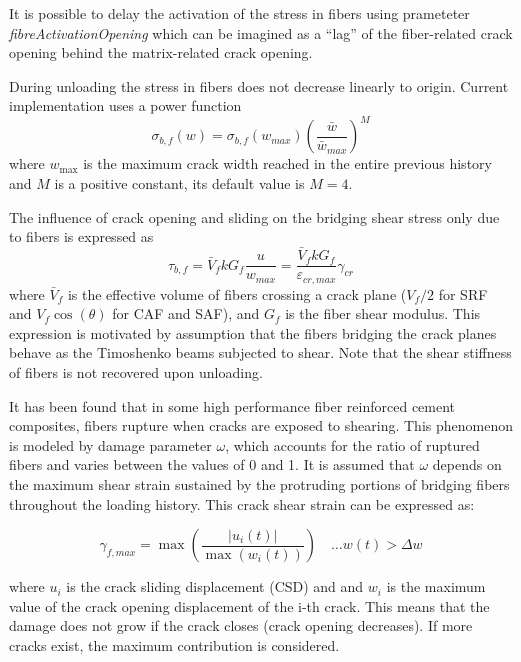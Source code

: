 \documentclass[a4paper]{article}
\newcommand{\param}[1]{{\it #1}}
\begin{document}
It is possible to delay the activation of the stress in fibers using prameteter \param{fibreActivationOpening} which can be imagined as a ``lag'' of the fiber-related crack opening behind the matrix-related crack opening.
 

During unloading the stress in fibers does not decrease linearly to origin. Current implementation uses a power function
%
\begin{equation}
  \sigma_{b,f}(w) = \sigma_{b,f}(w_{max}) \left(\frac{\bar{w}}{\bar{w}_{max}}\right)^M
\end{equation}
%
where $w_{\mathrm{max}}$ is the maximum crack width reached in the entire previous history and $M$ is a positive constant, its default value is $M = 4$.

The influence of crack opening and sliding on the bridging shear stress only due to fibers is expressed as 
\begin{equation}
\tau_{b,f} = \bar{V}_f k G_{f} \frac{u}{w_{max}} = \frac{\bar{V}_f k G_{f}}{\varepsilon_{cr,max}} \gamma_{cr} 
\end{equation}
%
where $\bar{V}_f$ is the effective volume of fibers crossing a crack plane ($V_f/2$ for SRF and $V_f \cos (\theta)$ for CAF and SAF), and $G_{f}$ is the fiber shear modulus. This expression is motivated by assumption that the fibers bridging the crack planes behave as the Timoshenko beams subjected to shear. Note that the shear stiffness of fibers is not recovered upon unloading.

It has been found that in some high performance fiber reinforced cement composites, fibers rupture when cracks are exposed to shearing. This phenomenon is modeled by damage parameter $\omega$, which accounts for the ratio of ruptured fibers and varies between the values of 0 and 1. It is assumed that $\omega$ depends on the maximum shear strain sustained by the protruding portions of bridging fibers throughout the loading history. This crack shear strain can be expressed as:

\begin{equation}
\gamma_{f,max} = \max \left( \frac{\left| u_i(t) \right|}{ \max \left(w_i(t) \right)} \right) \quad \dots w(t) > \Delta w
\end{equation}

where $u_i$ is the crack sliding displacement (CSD) and and $w_i$ is the maximum value of the crack opening displacement of the i-th crack. This means that the damage does not grow if the crack closes (crack opening decreases). If more cracks exist, the maximum contribution is considered. 
\end{document}
